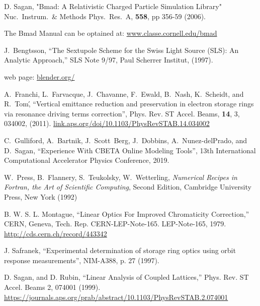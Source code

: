 \begin{thebibliography}{99}

D. Sagan,
"Bmad: A Relativistic Charged Particle Simulation Library"
Nuc.\ Instrum.\ \& Methods Phys.\ Res.\ A, {\bf 558}, pp 356-59 (2006).

The Bmad Manual can be optained at:
\hfill\break
\hspace*{20pt} 
\url{www.classe.cornell.edu/bmad}

J.~Bengtsson,
``The Sextupole Scheme for the Swiss Light Source (SLS): An Analytic Approach,''
SLS Note 9/97, Paul Scherrer Institut, (1997).

 web page:
\hfill\break
\hspace*{20pt} 
\url{blender.org/}

A.~Franchi, L.~Farvacque, J.~Chavanne, F.~Ewald, B.~Nash, K.~Scheidt, and R.~Tom\',
``Vertical emittance reduction and preservation in electron storage rings via resonance driving terms correction'',
Phys. Rev. ST Accel. Beams,
{\bf 14}, 3, 034002, (2011). 
\hfill\break
\hspace*{20pt}
\url{link.aps.org/doi/10.1103/PhysRevSTAB.14.034002}

C.~Gulliford, A.~Bartnik, J.~Scott~Berg, J.~Dobbins, A.~Nunez-delPrado, and D.~Sagan,
``Experience With CBETA Online Modeling Tools'',
13th International Computational Accelerator Physics Conference, 2019.

W.~Press, B.~Flannery, S.~Teukolsky, W.~Wetterling,
{\em Numerical Recipes in Fortran, the Art of Scientific Computing},
Second Edition, Cambridge University Press, New York (1992)

B. W. S. L. Montague, “Linear Optics For Improved Chromaticity Correction,” 
CERN, Geneva, Tech. Rep. CERN-LEP-Note-165. LEP-Note-165, 1979. 
\url{http://cds.cern.ch/record/443342}

J. Safranek, ``Experimental determination of storage ring optics
using orbit response measurements'', NIM-A388, p. 27 (1997).

D. Sagan, and D. Rubin,
``Linear Analysis of Coupled Lattices,''
Phys. Rev. ST Accel. Beams 2, 074001 (1999).
\hfill\break
\hspace*{20pt}
\url{https://journals.aps.org/prab/abstract/10.1103/PhysRevSTAB.2.074001}


\end{thebibliography}
